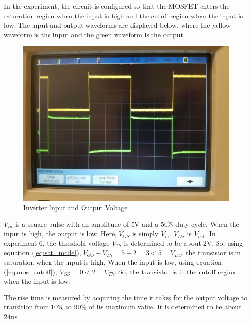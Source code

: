 In the experiment, the circuit is configured so that the MOSFET enters the saturation region when the input is high and the cutoff region when the input is low. The input and output waveforms are displayed below, where the yellow waveform is the input and the green waveform is the output.

\FloatBarrier
\begin{figure}[h!]
	\centering
	\includegraphics[scale=0.25]{./images/inverter_in_out.jpeg}
	\caption{Inverter Input and Output Voltage}
	\label{fig:inverter_in_out}
\end{figure}
\FloatBarrier

$V_{in}$ is a square pulse with an amplitude of $5$\si{\volt} and a $50\%$ duty cycle. When the input is high, the output is low. Here, $V_{GS}$ is simply $V_{in}$. $V_{DS}$ is $V_{out}$. In experiment 6, the threshold voltage $V_{Th}$ is determined to be about $2$\si{\volt}. So, using equation (\ref{eq:sat_mode}), $V_{GS} - V_{Th} = 5 - 2 = 3 < 5 = V_{DS}$, the transistor is in saturation when the input is high. When the input is low, using equation (\ref{eq:mos_cutoff}), $V_{GS} = 0 < 2 = V_{Th}$. So, the transistor is in the cutoff region when the input is low.

The rise time is measured by acquiring the time it takes for the output voltage to transition from $10\%$ to $90\%$ of its maximum value. It is determined to be about $24$\si{\nano\second}.

